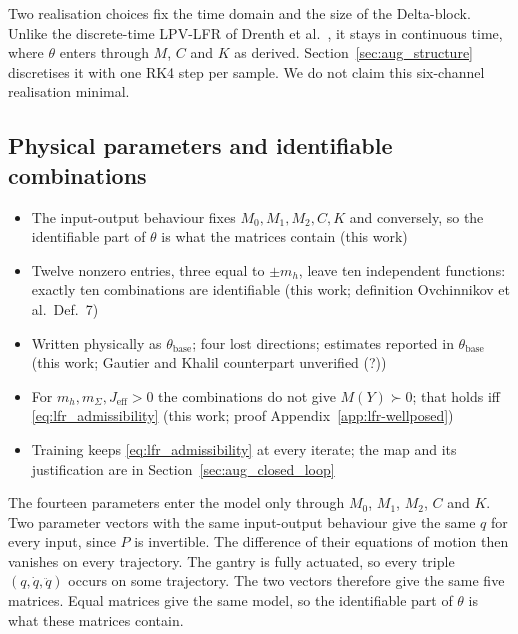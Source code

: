 Two realisation choices fix the time domain and the size of the Delta-block.
Unlike the discrete-time LPV-LFR of Drenth et
al.~\cite[Sec.~3.1]{drenth2025lpvlfr}, it stays in continuous time, where
$\theta$ enters through $M$, $C$ and $K$ as derived.
Section~\ref{sec:aug_structure} discretises it with one RK4 step per sample.
We do not claim this six-channel realisation minimal.

\subsection{Physical parameters and identifiable combinations}\label{sec:params}
\ifdraft
\begin{itemize}
\item The input-output behaviour fixes $M_0,M_1,M_2,C,K$ and conversely, so the identifiable part of $\theta$ is what the matrices contain (this work)
\item Twelve nonzero entries, three equal to $\pm m_h$, leave ten independent functions: exactly ten combinations are identifiable (this work; definition Ovchinnikov et al.\ Def.~7)
\item Written physically as $\theta_{\mathrm{base}}$; four lost directions; estimates reported in $\theta_{\mathrm{base}}$ (this work; Gautier and Khalil counterpart unverified (?))
\item For $m_h,m_\Sigma,J_{\mathrm{eff}}>0$ the combinations do not give $M(Y)\succ0$; that holds iff \eqref{eq:lfr_admissibility} (this work; proof Appendix~\ref{app:lfr-wellposed})
\item Training keeps \eqref{eq:lfr_admissibility} at every iterate; the map and its justification are in Section~\ref{sec:aug_closed_loop}
\end{itemize}
\fi
The fourteen parameters enter the model only through $M_0$, $M_1$, $M_2$,
$C$ and $K$.
Two parameter vectors with the same input-output behaviour give the same $q$
for every input, since $P$ is invertible.
The difference of their equations of motion then vanishes on every
trajectory.
The gantry is fully actuated, so every triple $(q,\dot q,\ddot q)$ occurs on
some trajectory.
The two vectors therefore give the same five matrices.
Equal matrices give the same model, so the identifiable part of $\theta$ is
what these matrices contain.

